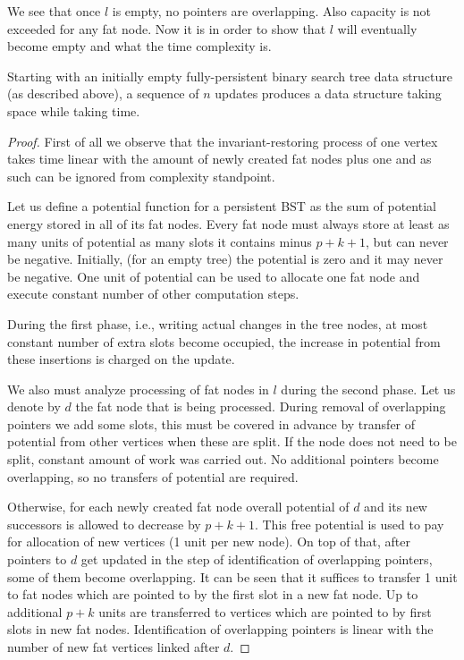 

We see that once $l$ is empty, no pointers are overlapping. Also capacity is not exceeded for any fat node. Now it is in order to show that $l$ will eventually become empty and what the time complexity is.

\begin{prop}
Starting with an initially empty fully-persistent binary search tree data structure (as described above), a sequence of $n$ updates produces a data structure taking  space while taking  time.
\end{prop}

\begin{proof}
First of all we observe that the invariant-restoring process of one vertex takes time linear with the amount of newly created fat nodes plus one and as such can be ignored from complexity standpoint.
	
Let us define a potential function for a persistent BST as the sum of potential energy stored in all of its fat nodes. 
Every fat node must always store at least as many units of potential as many slots it contains minus $p+k+1$, but can never be negative. 
Initially, (for an empty tree) the potential is zero and it may never be negative. One unit of potential can be used to allocate one fat node and execute constant number of other computation steps.

During the first phase, i.e., writing actual changes in the tree nodes, at most constant number of extra slots become occupied, the increase in potential from these insertions is charged on the update.

We also must analyze processing of fat nodes in $l$ during the second phase. Let us denote by $d$ the fat node that is being processed. 
During removal of overlapping pointers we add some slots, this must be covered in advance by transfer of potential from other vertices when these are split. 
If the node does not need to be split, constant amount of work was carried out. 
No additional pointers become overlapping, so no transfers of potential are required.

Otherwise, for each newly created fat node overall potential of $d$ and its new successors is allowed to decrease by $p+k+1$.
This free potential is used to pay for allocation of new vertices (1 unit per new node). 
On top of that, after pointers to $d$ get updated in the step of identification of overlapping pointers, some of them become overlapping. 
It can be seen that it suffices to transfer 1 unit to fat nodes which are pointed to by the first slot in a new fat node. 
Up to additional $p+k$ units are transferred to vertices which are pointed to by first slots in new fat nodes.
Identification of overlapping pointers is linear with the number of new fat vertices linked after $d$.


\end{proof}
